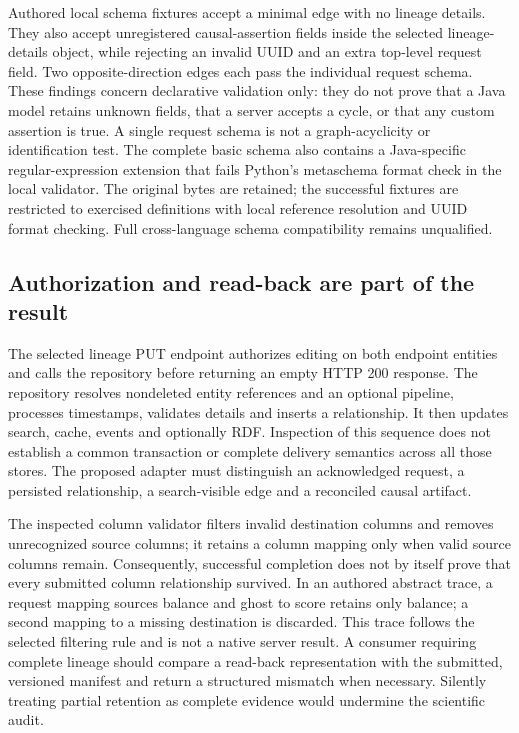 Authored local schema fixtures accept a minimal edge with no lineage details.
They also accept unregistered causal-assertion fields inside the selected
lineage-details object, while rejecting an invalid UUID and an extra top-level
request field. Two opposite-direction edges each pass the individual request
schema. These findings concern declarative validation only: they do not prove
that a Java model retains unknown fields, that a server accepts a cycle, or that
any custom assertion is true. A single request schema is not a graph-acyclicity
or identification test. The complete basic schema also contains a Java-specific
regular-expression extension that fails Python's metaschema format check in the
local validator. The original bytes are retained; the successful fixtures are
restricted to exercised definitions with local reference resolution and UUID
format checking. Full cross-language schema compatibility remains unqualified.
\citep{exec24_openmetadata_source,exec24_openmetadata_reference}

\subsection{Authorization and read-back are part of the result}

The selected lineage PUT endpoint authorizes editing on both endpoint entities
and calls the repository before returning an empty HTTP 200 response. The
repository resolves nondeleted entity references and an optional pipeline,
processes timestamps, validates details and inserts a relationship. It then
updates search, cache, events and optionally RDF. Inspection of this sequence
does not establish a common transaction or complete delivery semantics across
all those stores. The proposed adapter must distinguish an acknowledged request,
a persisted relationship, a search-visible edge and a reconciled causal artifact.
\citep{exec24_openmetadata_source}

The inspected column validator filters invalid destination columns and removes
unrecognized source columns; it retains a column mapping only when valid source
columns remain. Consequently, successful completion does not by itself prove
that every submitted column relationship survived. In an authored abstract
trace, a request mapping sources balance and ghost to score retains only
balance; a second mapping to a missing destination is discarded. This trace
follows the selected filtering rule and is not a native server result. A consumer
requiring complete lineage should compare a read-back representation with the
submitted, versioned manifest and return a structured mismatch when necessary.
Silently treating partial retention as complete evidence would undermine the
scientific audit.\citep{exec24_openmetadata_source,exec24_openmetadata_reference}

